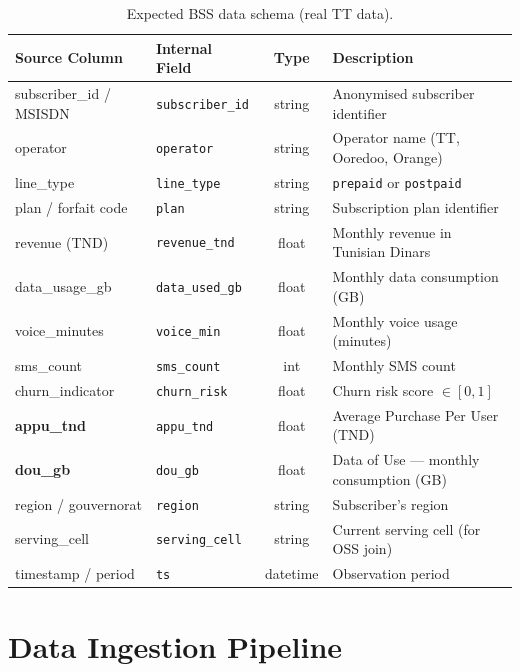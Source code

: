 \begin{table}[H]
\centering
\caption{Expected BSS data schema (real TT data).}
\label{tab:bss-schema}
\begin{tabularx}{\textwidth}{@{}llcX@{}}
\toprule
\textbf{Source Column} & \textbf{Internal Field} & \textbf{Type} & \textbf{Description} \\
\midrule
subscriber\_id / MSISDN & \texttt{subscriber\_id}  & string  & Anonymised subscriber identifier \\
operator                 & \texttt{operator}         & string  & Operator name (TT, Ooredoo, Orange) \\
line\_type               & \texttt{line\_type}       & string  & \texttt{prepaid} or \texttt{postpaid} \\
plan / forfait code      & \texttt{plan}             & string  & Subscription plan identifier \\
revenue (TND)            & \texttt{revenue\_tnd}     & float   & Monthly revenue in Tunisian Dinars \\
data\_usage\_gb           & \texttt{data\_used\_gb}   & float   & Monthly data consumption (GB) \\
voice\_minutes            & \texttt{voice\_min}       & float   & Monthly voice usage (minutes) \\
sms\_count                & \texttt{sms\_count}       & int     & Monthly SMS count \\
churn\_indicator          & \texttt{churn\_risk}      & float   & Churn risk score $\in [0, 1]$ \\
\textbf{appu\_tnd}       & \texttt{appu\_tnd}        & float   & Average Purchase Per User (TND) \\
\textbf{dou\_gb}         & \texttt{dou\_gb}          & float   & Data of Use --- monthly consumption (GB) \\
region / gouvernorat     & \texttt{region}            & string  & Subscriber's region \\
serving\_cell             & \texttt{serving\_cell}    & string  & Current serving cell (for OSS join) \\
timestamp / period       & \texttt{ts}               & datetime & Observation period \\
\bottomrule
\end{tabularx}
\end{table}

\section{Data Ingestion Pipeline}

